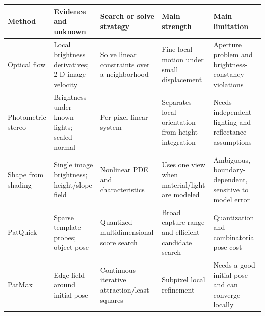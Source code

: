 {\def\LTcaptype{none} %
\begin{longtable}[]{@{}
  >{\raggedright\arraybackslash}p{}
  >{\raggedright\arraybackslash}p{}
  >{\raggedright\arraybackslash}p{}
  >{\raggedright\arraybackslash}p{}
  >{\raggedright\arraybackslash}p{}@{}}
\toprule\noalign{}
\begin{minipage}[b]{\linewidth}\raggedright
Method
\end{minipage} & \begin{minipage}[b]{\linewidth}\raggedright
Evidence and unknown
\end{minipage} & \begin{minipage}[b]{\linewidth}\raggedright
Search or solve strategy
\end{minipage} & \begin{minipage}[b]{\linewidth}\raggedright
Main strength
\end{minipage} & \begin{minipage}[b]{\linewidth}\raggedright
Main limitation
\end{minipage} \\
\midrule\noalign{}
\endhead
\bottomrule\noalign{}
\endlastfoot
Optical flow & Local brightness derivatives; 2-D image velocity & Solve linear constraints over a neighborhood & Fine local motion under small displacement & Aperture problem and brightness-constancy violations \\
Photometric stereo & Brightness under known lights; scaled normal & Per-pixel linear system & Separates local orientation from height integration & Needs independent lighting and reflectance assumptions \\
Shape from shading & Single image brightness; height/slope field & Nonlinear PDE and characteristics & Uses one view when material/light are modeled & Ambiguous, boundary-dependent, sensitive to model error \\
PatQuick & Sparse template probes; object pose & Quantized multidimensional score search & Broad capture range and efficient candidate search & Quantization and combinatorial pose cost \\
PatMax & Edge field around initial pose & Continuous iterative attraction/least squares & Subpixel local refinement & Needs a good initial pose and can converge locally \\

\end{longtable}}
